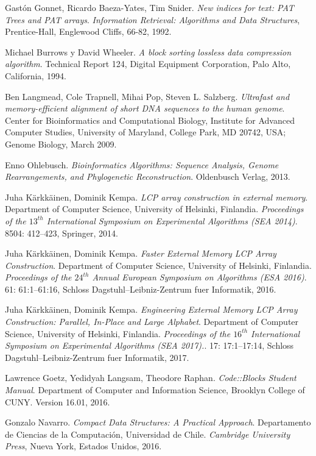 \documentclass[letterpaper, 10pt, notitlepage]{report}
\begin{document}
\begin{thebibliography}{9}
Gastón Gonnet, Ricardo Baeza-Yates, Tim Snider.
\textit{New indices for text: PAT Trees and PAT arrays}.
\textit{Information Retrieval: Algorithms and Data Structures}, Prentice-Hall, Englewood Cliffs, 66-82, 1992.

Michael Burrows y David Wheeler.
\textit{A block sorting lossless data compression algorithm}. 
Technical Report 124, Digital Equipment Corporation, Palo Alto, California, 1994.

Ben Langmead, Cole Trapnell, Mihai Pop, Steven L. Salzberg.
\textit{Ultrafast and memory-efficient alignment of short DNA sequences to the human genome}. 
Center for Bioinformatics and Computational Biology, Institute for Advanced Computer Studies, University of Maryland, College Park, MD 20742, USA; Genome Biology, March 2009.

Enno Ohlebusch.
\textit{Bioinformatics Algorithms: Sequence Analysis, Genome Rearrangements, and Phylogenetic Reconstruction}. 
Oldenbusch Verlag, 2013.

Juha Kärkkäinen, Dominik Kempa.
\textit{LCP array construction in external memory}.
Department of Computer Science, University of Helsinki, Finlandia.
\textit{Proceedings of the $13^{th}$ International Symposium on Experimental Algorithms (SEA 2014)}.
8504: 412–423, Springer, 2014.

Juha Kärkkäinen, Dominik Kempa.
\textit{Faster External Memory LCP Array Construction}.
Department of Computer Science, University of Helsinki, Finlandia.
\textit{Proceedings of the $24^{th}$ Annual European Symposium on Algorithms (ESA 2016)}.
61: 61:1–61:16, Schloss Dagstuhl–Leibniz-Zentrum fuer Informatik, 2016.

Juha Kärkkäinen, Dominik Kempa.
\textit{Engineering External Memory LCP Array Construction: Parallel, In-Place and Large Alphabet}.
Department of Computer Science, University of Helsinki, Finlandia.
\textit{Proceedings of the $16^{th}$ International Symposium on Experimental Algorithms (SEA 2017).}.
17: 17:1–17:14, Schloss Dagstuhl–Leibniz-Zentrum fuer Informatik, 2017.

Lawrence Goetz, Yedidyah Langsam, Theodore Raphan.
\textit{Code::Blocks Student Manual}.
Department of Computer and Information Science, Brooklyn College of CUNY.
Version 16.01, 2016.

Gonzalo Navarro.
\textit{Compact Data Structures: A Practical Approach}.
Departamento de Ciencias de la Computación, Universidad de Chile.
\textit{Cambridge University Press}, Nueva York, Estados Unidos, 2016.


\end{thebibliography}
\end{document}
